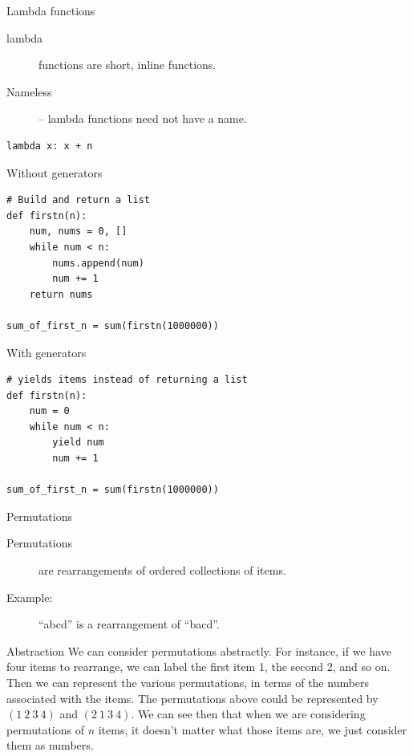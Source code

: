\begin{frame}[fragile]{Lambda functions}
	\begin{description}
	  \item[lambda] functions are short, inline functions.
	  \item[Nameless] -- lambda functions need not have a name.
	\end{description}
	\begin{verbatim}
lambda x: x + n
  \end{verbatim}
\end{frame}



\begin{frame}[fragile]{Without generators}
	\begin{verbatim}
# Build and return a list
def firstn(n):
    num, nums = 0, []
    while num < n:
        nums.append(num)
        num += 1
    return nums

sum_of_first_n = sum(firstn(1000000))
  \end{verbatim}
\end{frame}

\begin{frame}[fragile]{With generators}
	\begin{verbatim}
# yields items instead of returning a list
def firstn(n):
    num = 0
    while num < n:
        yield num
        num += 1

sum_of_first_n = sum(firstn(1000000))
  \end{verbatim}
\end{frame}


\begin{frame}[fragile]{Permutations}
	\begin{description}
		\item[Permutations] are rearrangements of ordered collections of items.
		\item[Example:] ``abcd'' is a rearrangement of ``bacd''.
	\end{description}
	
	\begin{block}{Abstraction}
		We can consider permutations abstractly.
		For instance, if we have four items to rearrange, we can label the first item 1, the second 2, and so on.
		Then we can represent the various permutations, in terms of the numbers associated with the items.
		The permutations above could be represented by $(1\ 2\ 3\ 4)$ and $(2\ 1\ 3\ 4)$.
		We can see then that when we are considering permutations of $n$ items, it doesn't matter what those items are, we just consider them as numbers.
	\end{block}
\end{frame}


